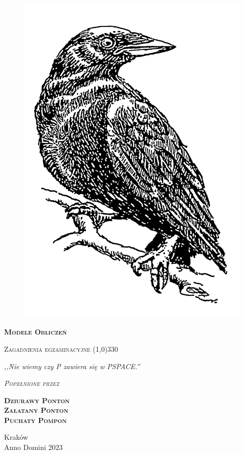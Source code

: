 \begin{titlepage}
	\begin{center}
		\begin{figure}[h]
			\centering
			\includegraphics{img/crow.png}
		\end{figure}

		\Huge
		\textbf{\textsc{Modele Obliczeń}}

		\vspace{0.5cm}
		\Large
		\textsc{Zagadnienia egzaminacyjne}
		\line(1,0){330}

		\normalsize

		\vspace{1cm}
		\textit{,,Nie wiemy czy P zawiera się w PSPACE.''}
		\vspace{1cm}

		\textit{\textsc{Popełnione przez}}\\
		\vspace{5mm}

		\textbf{\textsc{Dziurawy Ponton} \\ \textsc{Załatany Ponton} \\ \textsc{Puchaty Pompon} }

		\vfill

		Kraków \\
		Anno Domini 2023
	\end{center}
\end{titlepage}